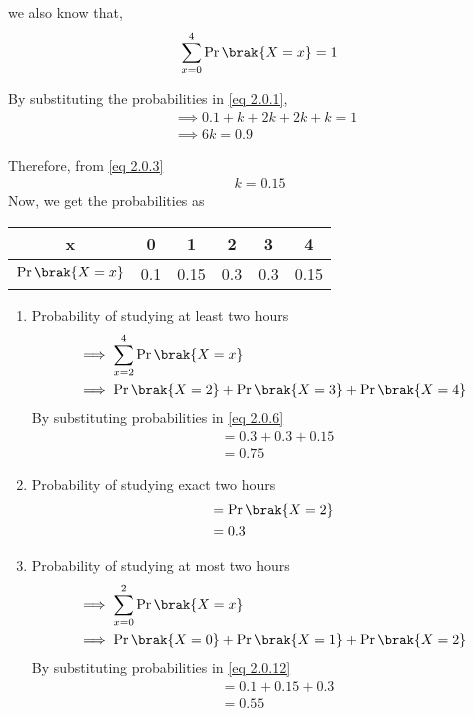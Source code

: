 \documentclass[journal,12pt,twocolumn]{IEEEtran}
\begin{document}
we also know that,
\begin{align}
    \sum_{x = 0}^4 \Pr\brak{X = x} = 1 \label{eq 2.0.1}
\end{align}

By substituting the probabilities in \eqref{eq 2.0.1},\vspace{10mm}
\begin{align}
& \implies 0.1 + k + 2k + 2k + k = 1 \\
& \implies 6k = 0.9 \label{eq 2.0.3}
\end{align}

Therefore, from \eqref{eq 2.0.3}
\begin{align}
    k = 0.15
\end{align}
  Now, we get the probabilities as
  
  \begin{center}
  
  \begin{tabular}{|c|c|c|c|c|c|}
    \hline
    x &  0 & 1 & 2 & 3 & 4\\
    \hline
    $\Pr\brak{X=x}$ & 0.1& 0.15& 0.3 & 0.3 & 0.15\\
    \hline
    
\end{tabular} 
\end{center}
\vspace{3mm}
    \begin{enumerate}
        \item Probability of studying at least two hours 
        \begin{align}
            & \implies \sum_{x = 2}^4 \Pr\brak{X = x}\\
            & \implies \Pr\brak{X = 2} +\Pr\brak{X = 3} + \Pr\brak{X = 4} \label{eq 2.0.6}
        \end{align}
        By substituting probabilities in \eqref{eq 2.0.6}
        \begin{align}
            & = 0.3 + 0.3 + 0.15\\
            & = 0.75
        \end{align}
        
        \item Probability of studying exact two hours
        \begin{align}
            & = \Pr\brak{X = 2}\\
            & = 0.3
        \end{align}
        
        \item Probability of studying at most two hours 
        \begin{align}
          & \implies \sum_{x = 0}^2  \Pr\brak{X = x}\\
          & \implies \Pr\brak{X = 0} + \Pr\brak{X = 1} + \Pr\brak{X = 2} \label{eq 2.0.12}
        \end{align}
        By substituting probabilities in \eqref{eq 2.0.12}
        \begin{align}
            & = 0.1 + 0.15 + 0.3\\
            & = 0.55
        \end{align}
    \end{enumerate}
    
\end{document}
